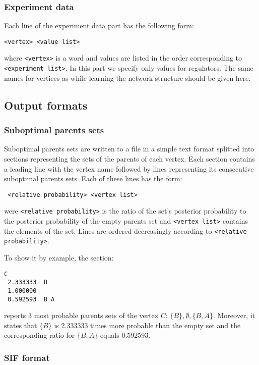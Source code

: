 \subsubsection{Experiment data}

 Each line of the experiment data part has the following form:
\begin{verbatim}
<vertex> <value list>
\end{verbatim}
 where \texttt{<vertex>} is a word and values are listed in the order corresponding to \texttt{<experiment list>}.
 In this part we specify only values for regulators. The same names for vertices as while learning the network structure
 should be given here. 

\subsection{Output formats}\label{output}

\subsubsection{Suboptimal parents sets}

 Suboptimal parents sets are written to a file in a simple text format
 splitted into sections representing the sets of the parents of each vertex.
 Each section contains a leading line with the vertex name
 followed by lines representing its consecutive suboptimal parents sets.
 Each of these lines has the form:
\begin{verbatim}
 <relative probability> <vertex list>
\end{verbatim}
 were \texttt{<relative probability>} is the ratio of the set's posterior probability
 to the posterior probability of the empty parents set
 and \texttt{<vertex list>} contains the elements of the set.
 Lines are ordered decreasingly according to \texttt{<relative probability>}.

To show it by example, the section:
\begin{verbatim}
C
 2.333333  B
 1.000000 
 0.592593  B A
\end{verbatim}
reports 3 most probable parents sets of the vertex $C$: $\{B\},\emptyset,\{B,A\}$.
Moreover, it states that $\{B\}$ is 2.333333 times more probable than the empty set
and the corresponding ratio for $\{B,A\}$ equals 0.592593.
 
\subsubsection{SIF format}


